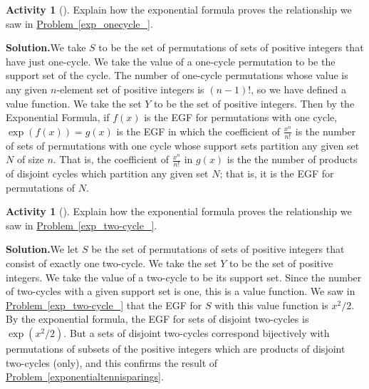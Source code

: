 \documentclass[10pt,]{book}
\theoremstyle{plain}
\theoremstyle{definition}
\newtheorem{activity}[project]{Activity}
\numberwithin{equation}{chapter}
\begin{document}
\begin{activity}[]\label{activity-374}
Explain how the exponential formula proves the relationship we saw in \hyperref[exp_onecycle_]{Problem~\ref{exp_onecycle_}}.%
\par\medskip\noindent%
\textbf{Solution.}\quad We take \(S\) to be the set of permutations of sets of positive integers that have just one-cycle. We take the value of a one-cycle permutation to be the support set of the cycle. The number of one-cycle permutations whose value is any given \(n\)-element set of positive integers is \((n-1)!\), so we have defined a value function. We take the set \(Y\) to be the set of positive integers. Then by the Exponential Formula, if \(f(x)\) is the EGF for permutations with one cycle, \(\exp(f(x))=g(x)\) is the EGF in which the coefficient of \(\frac{x^n}{n!}\) is the number of sets of permutations with one cycle whose support sets partition any given set \(N\) of size \(n\). That is, the coefficient of \(\frac{x^n}{n!}\) in \(g(x)\) is the the number of products of disjoint cycles which partition any given set \(N\); that is, it is the EGF for permutations of \(N\).%
\end{activity}
\begin{activity}[]\label{activity-375}
Explain how the exponential formula proves the relationship we saw in \hyperref[exp_two-cycle_]{Problem~\ref{exp_two-cycle_}}.%
\par\medskip\noindent%
\textbf{Solution.}\quad We let \(S\) be the set of permutations of sets of positive integers that consist of exactly one two-cycle. We take the set \(Y\) to be the set of positive integers. We take the value of a two-cycle to be its support set. Since the number of two-cycles with a given support set is one, this is a value function. We saw in \hyperref[exp_two-cycle_]{Problem~\ref{exp_two-cycle_}} that the EGF for \(S\) with this value function is \(x^2/2\). By the exponential formula, the EGF for sets of disjoint two-cycles is \(\exp(x^2/2)\). But a sets of disjoint two-cycles correspond bijectively with permutations of subsets of the positive integers which are products of disjoint two-cycles (only), and this confirms the result of \hyperref[exponentialtennisparings]{Problem~\ref{exponentialtennisparings}}.%
\end{activity}
\end{document}
